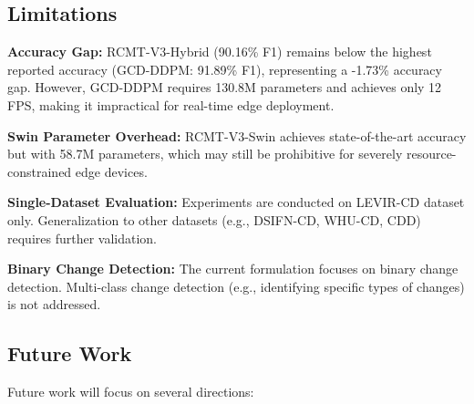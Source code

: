 \documentclass[journal]{IEEEtran}
\begin{document}
\subsection{Limitations}

\textbf{Accuracy Gap:} RCMT-V3-Hybrid (90.16\% F1) remains below the highest reported accuracy (GCD-DDPM: 91.89\% F1), representing a -1.73\% accuracy gap. However, GCD-DDPM requires 130.8M parameters and achieves only 12 FPS, making it impractical for real-time edge deployment.

\textbf{Swin Parameter Overhead:} RCMT-V3-Swin achieves state-of-the-art accuracy but with 58.7M parameters, which may still be prohibitive for severely resource-constrained edge devices.

\textbf{Single-Dataset Evaluation:} Experiments are conducted on LEVIR-CD dataset only. Generalization to other datasets (e.g., DSIFN-CD, WHU-CD, CDD) requires further validation.

\textbf{Binary Change Detection:} The current formulation focuses on binary change detection. Multi-class change detection (e.g., identifying specific types of changes) is not addressed.

\subsection{Future Work}

Future work will focus on several directions:
\end{document}
